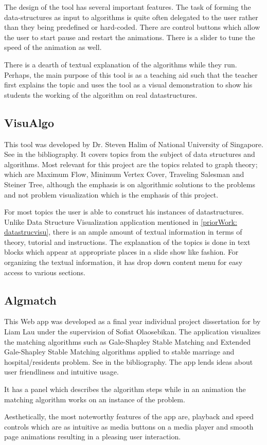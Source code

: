 The design of the tool has several important features.  The task of forming the
data-structures as input to algorithms is quite often delegated to the user
rather than they being predefined or hard-coded.  There are control buttons
which allow the user to start pause and restart the animations. There is a
slider to tune the speed of the animation as well.

There is a dearth of textual explanation of the algorithms while they run.
Perhaps, the main purpose of this tool is as a teaching aid such that the
teacher first explains the topic and uses the tool as a visual demonstration to
show his students the working of the algorithm on real datastructures.

\subsection{VisuAlgo}
\label{priorWork: visualgo}
This tool was developed by Dr. Steven Halim of National University of
Singapore. See \cite{HalimVisu} in the bibliography. It covers topics from the
subject of data structures and algorithms. Most relevant for this project are
the topics related to graph theory; which are Maximum Flow, Minimum Vertex
Cover, Traveling Salesman and Steiner Tree, although the emphasis is on
algorithmic solutions to the problems and not problem visualization which is
the emphasis of this project.

For most topics the user is able to construct his instances of datastructures.
Unlike Data Structure Visualization application mentioned in
\autoref{priorWork: datastrucvisu}, there is an ample amount of textual
information in terms of theory, tutorial and instructions. The explanation of
the topics is done in text blocks which appear at appropriate places in a slide
show like fashion. For organizing the textual information, it has drop down
content menu for easy access to various sections. 

\subsection{Algmatch}
\label{priorWork: algmatch}
This Web app was developed as a final year individual project dissertation for
by Liam Lau under the supervision of Sofiat Olaosebikan. The application
visualizes the matching algorithms such as Gale-Shapley Stable Matching and
Extended Gale-Shapley Stable Matching algorithms applied to stable marriage and
hospital/residents problem. See \cite{LiamApp} in the bibliography. The app
lends ideas about user friendliness and intuitive usage.

It has a panel which describes the algorithm steps while in an animation the
matching algorithm works on an instance of the problem.

Aesthetically, the most noteworthy features of the app are, playback and speed
controls which are as intuitive as media buttons on a media player and smooth
page animations resulting in a pleasing user interaction.
